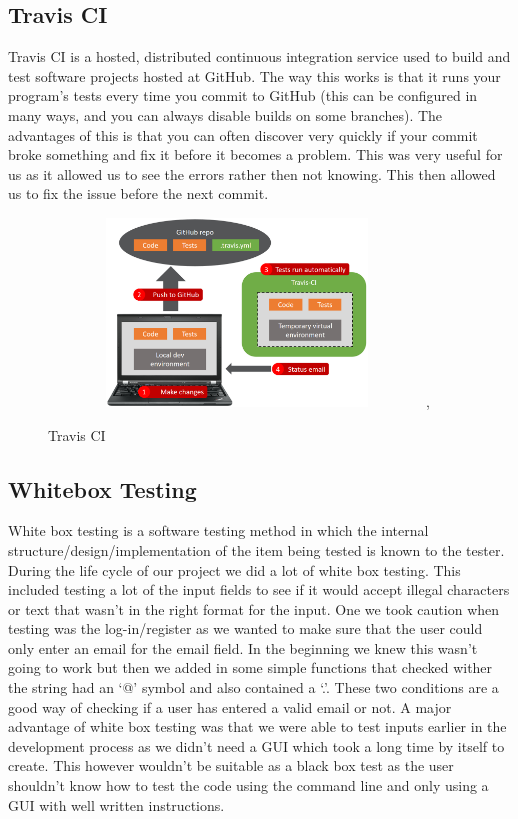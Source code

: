 \subsection{Travis CI}
Travis CI is a hosted, distributed continuous integration service used to build and test software projects hosted at GitHub. The way this works is that it runs your program's tests every time you commit to GitHub (this can be configured in many ways, and you can always disable builds on some branches). The advantages of this is that you can often discover very quickly if your commit broke something and fix it before it becomes a problem. This was very useful for us as it allowed us to see the errors rather then not knowing. This then allowed us to fix the issue before the next commit. 

\begin{figure}[ht]
\renewcommand\thefigure{3.3}
\centering
\includegraphics[width=10cm, height=5cm]{img/travis.png},
\caption{Travis CI}
\label{TravisCI}
\end{figure}

\subsection{Whitebox Testing}
White box testing is a software testing method in which the internal structure/design/implementation of the item being tested is known to the tester. During the life cycle of our project we did a lot of white box testing. This included testing a lot of the input fields to see if it would accept illegal characters or text that wasn’t in the right format for the input. One we took caution when testing was the log-in/register as we wanted to make sure that the user could only enter an email for the email field. In the beginning we knew this wasn’t going to work but then we added in some simple functions that checked wither the string had an ‘@’ symbol and also contained a ‘.’. These two conditions are a good way of checking if a user has entered a valid email or not. A major advantage of white box testing was that we were able to test inputs earlier in the development process as we didn’t need a GUI which took a long time by itself to create. This however wouldn’t be suitable as a black box test as the user shouldn’t know how to test the code using the command line and only using a GUI with well written instructions.

